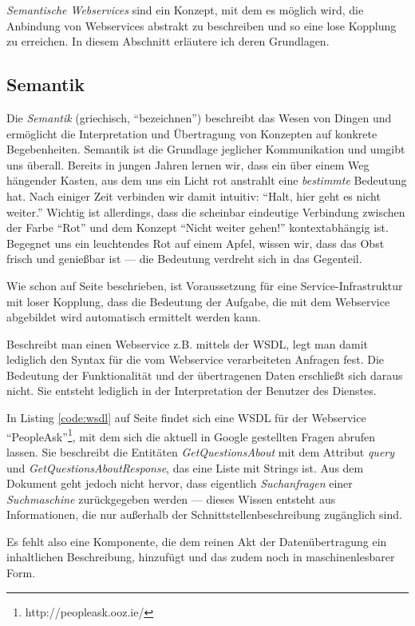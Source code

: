 
\emph{Semantische Webservices} sind ein Konzept, mit dem es möglich wird, die Anbindung von Webservices abstrakt zu beschreiben und so eine lose Kopplung zu erreichen. In diesem Abschnitt erläutere ich deren Grundlagen.

\subsection{Semantik}

Die \emph{Semantik} (griechisch, "`bezeichnen"') beschreibt das Wesen von Dingen und ermöglicht die Interpretation und Übertragung von Konzepten auf konkrete Begebenheiten. Semantik ist die Grundlage jeglicher Kommunikation und umgibt uns überall. Bereits in jungen Jahren lernen wir, dass ein über einem Weg hängender Kasten, aus dem uns ein Licht rot anstrahlt eine \emph{bestimmte} Bedeutung hat. Nach einiger Zeit verbinden wir damit intuitiv: "`Halt, hier geht es nicht weiter."' Wichtig ist allerdings, dass die scheinbar eindeutige Verbindung zwischen der Farbe "`Rot"' und dem Konzept "`Nicht weiter gehen!"' kontextabhängig ist. Begegnet uns ein leuchtendes Rot auf einem Apfel, wissen wir, dass das Obst frisch und genießbar ist --- die Bedeutung verdreht sich in das Gegenteil.

Wie schon auf Seite \pageref{l:intro-loosecoupling} beschrieben, ist Voraussetzung für eine Service-Infrastruktur mit loser Kopplung, dass die Bedeutung der Aufgabe, die mit dem Webservice abgebildet wird automatisch ermittelt werden kann.

Beschreibt man einen Webservice z.B. mittels der \ac{WSDL}, legt man damit lediglich den Syntax für die vom Webservice verarbeiteten Anfragen fest. Die Bedeutung der Funktionalität und der übertragenen Daten erschließt sich daraus nicht. Sie entsteht lediglich in der Interpretation der Benutzer des Dienstes. 

In Listing \ref{code:wsdl} auf Seite \pageref{code:wsdl} findet sich eine WSDL für der Webservice "`PeopleAsk"'\footnote{http://peopleask.ooz.ie/}, mit dem sich die aktuell in Google gestellten Fragen abrufen lassen. Sie beschreibt die Entitäten \emph{GetQuestionsAbout} mit dem Attribut \emph{query} und \emph{GetQuestionsAboutResponse}, das eine Liste mit Strings ist. Aus dem Dokument geht jedoch nicht hervor, dass eigentlich \emph{Suchanfragen} einer \emph{Suchmaschine} zurückgegeben werden --- dieses Wissen entsteht aus Informationen, die nur außerhalb der Schnittstellenbeschreibung zugänglich sind.

Es fehlt also eine Komponente, die dem reinen Akt der Datenübertragung ein inhaltlichen Beschreibung, hinzufügt und das zudem noch in maschinenlesbarer Form.

